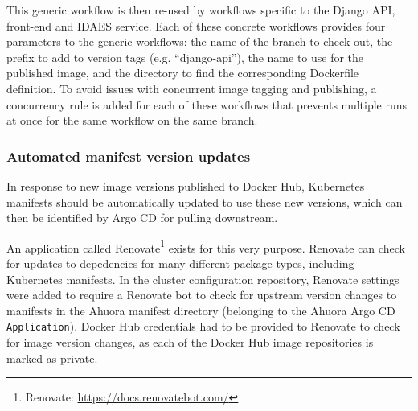 This generic workflow is then re-used by workflows specific to the Django API, front-end and IDAES service. Each of these concrete workflows provides four parameters to the generic workflows: the name of the branch to check out, the prefix to add to version tags (e.g. ``django-api''), the name to use for the published image, and the directory to find the corresponding Dockerfile definition. To avoid issues with concurrent image tagging and publishing, a concurrency rule is added for each of these workflows that prevents multiple runs at once for the same workflow on the same branch.

\subsubsection{Automated manifest version updates}

In response to new image versions published to Docker Hub, Kubernetes manifests should be automatically updated to use these new versions, which can then be identified by Argo CD for pulling downstream.

An application called Renovate\footnote{Renovate: \url{https://docs.renovatebot.com/}} exists for this very purpose. Renovate can check for updates to depedencies for many different package types, including Kubernetes manifests. In the cluster configuration repository, Renovate settings were added to require a Renovate bot to check for upstream version changes to manifests in the Ahuora manifest directory (belonging to the Ahuora Argo CD \verb|Application|). Docker Hub credentials had to be provided to Renovate to check for image version changes, as each of the Docker Hub image repositories is marked as private.

